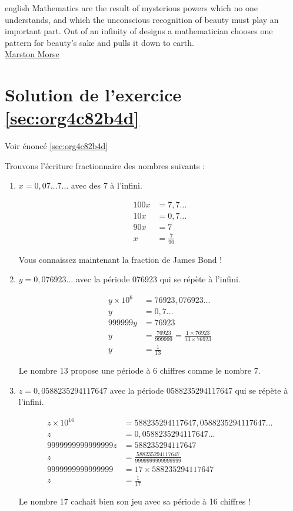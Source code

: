 \documentclass[a4paper, 11pt, twoside]{book}
\begin{document}
\begin{foreigndisplayquote}{english}
Mathematics are the result of mysterious powers which no one
understands, and which the unconscious recognition of beauty must
play an important part. Out of an infinity of designs a
mathematician chooses one pattern for beauty’s sake and pulls it
down to earth.\\

\href{https://en.wikipedia.org/wiki/Marston\_Morse}{Marston Morse}
\end{foreigndisplayquote}

\section{Solution de l'exercice \ref{sec:org4c82b4d}}
\label{sec:orgc0c59d7}
Voir énoncé \ref{sec:org4c82b4d}

Trouvons l'écriture fractionnaire des nombres suivants :
\begin{enumerate}
\item \(x = 0,07\dots7\dots\) avec des \(7\) à l'infini.

\begin{align*}
100x &= 7,7\dots\\
10x  &= 0,7\dots\\
90x &= 7\\
   x &= \frac{7}{90} 
\end{align*}

Vous connaissez maintenant la fraction de James Bond !
\item \(y = 0,076923\dots\) avec la période 076923 qui se répète à
l'infini.

\begin{align*}
y \times 10^6 &= 76923,076923\dots\\
y  &= 0,7\dots\\
999999y &= 76923\\
   y &= \frac{76923}{999999} = \frac{1\times 76923}{13\times 76923} \\
   y &= \frac{1}{13}
\end{align*}

Le nombre 13 propose une période à 6 chiffres comme le nombre 7.
\item \(z = 0,0588235294117647\) avec la période 0588235294117647 qui
se répète à l'infini.

\begin{align*}
z\times 10^{16} &= 588235294117647,0588235294117647\dots\\
z  &= 0,0588235294117647\dots\\
9999999999999999z &= 588235294117647\\
   z &= \frac{588235294117647}{9999999999999999}\\
   9999999999999999 &= 17\times 588235294117647 \\ 
   z &= \frac{1}{17}
\end{align*}

Le nombre 17 cachait bien son jeu avec sa période à 16 chiffres !
\end{enumerate}
\end{document}
